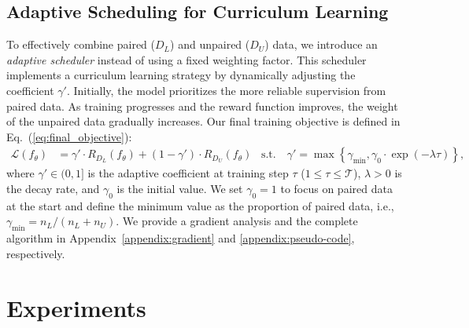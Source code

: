 \documentclass{article} %
\newcommand\rebuttal[1]{\textcolor{black}{#1}}
\begin{document}
\subsection{Adaptive Scheduling for Curriculum Learning}
\label{sec:adaptive_schedule}
To effectively combine paired ($D_L$) and unpaired ($D_U$) data, we introduce an \textit{adaptive scheduler} instead of using a fixed weighting factor. This scheduler implements a curriculum learning strategy by dynamically adjusting the coefficient $\gamma'$. Initially, the model prioritizes the more reliable supervision from paired data. As training progresses and the reward function improves, the weight of the unpaired data gradually increases.
Our final training objective is defined in Eq.~(\ref{eq:final_objective}):
\begin{align}
\mathcal{L}(f_\theta) &= \gamma' \cdot R_{D_L}(f_\theta) + (1 - \gamma') \cdot R_{D_U}(f_\theta) \;\;\; \text{s.t.} \quad \gamma' = \max \left\{ \gamma_{\min}, \gamma_0 \cdot \exp(-\lambda \tau) \right\}, \label{eq:final_objective}
\end{align}
where $\gamma' \in (0, 1]$ is the adaptive coefficient at training step $\tau$ ($1 \leq \tau \leq \mathcal{T}$), $\lambda>0$ is the decay rate, and $\gamma_0$ is the initial value. We set $\gamma_0 = 1$ to focus on paired data at the start and define the minimum value as the proportion of paired data, i.e., $\gamma_{\min} = n_L / (n_L + n_U)$. 
We provide a gradient analysis and the complete algorithm in Appendix~\ref{appendix:gradient} and \ref{appendix:pseudo-code}, respectively.


\section{Experiments}
\end{document}
